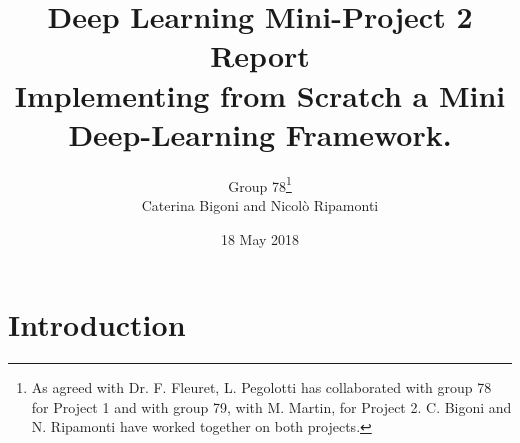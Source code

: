 \documentclass{article}
\begin{document}
\title{Deep Learning Mini-Project 2 Report \\ Implementing from Scratch a Mini Deep-Learning Framework.}
\author{Group 78\footnote{As agreed with Dr. F. Fleuret, L. Pegolotti has collaborated with group 78 for Project 1 and with group 79, with M. Martin, for Project 2. C. Bigoni and N. Ripamonti have worked together on both projects.}  \\ Caterina Bigoni and Nicol\`o Ripamonti}
\date{18 May 2018}
\maketitle





\section{Introduction}
\end{document}
